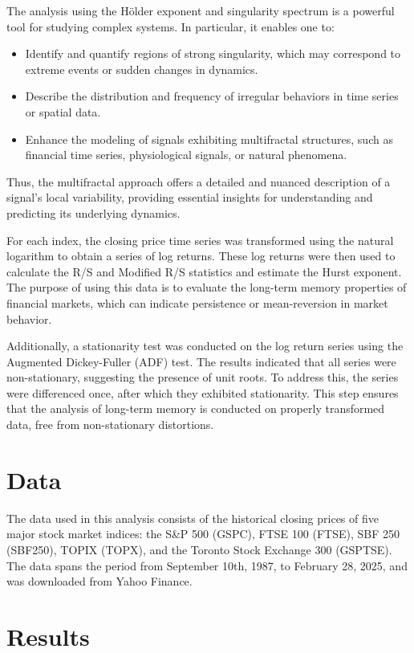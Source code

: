 \documentclass[11pt]{extarticle}
\begin{document}
The analysis using the Hölder exponent and singularity spectrum is a powerful tool for studying complex systems. In particular, it enables one to:
\begin{itemize}
    \item Identify and quantify regions of strong singularity, which may correspond to extreme events or sudden changes in dynamics.
    \item Describe the distribution and frequency of irregular behaviors in time series or spatial data.
    \item Enhance the modeling of signals exhibiting multifractal structures, such as financial time series, physiological signals, or natural phenomena.
\end{itemize}
Thus, the multifractal approach offers a detailed and nuanced description of a signal's local variability, providing essential insights for understanding and predicting its underlying dynamics.

For each index, the closing price time series was transformed using the natural logarithm to obtain a series of log returns.
These log returns were then used to calculate the R/S and Modified R/S statistics and estimate the Hurst exponent.
The purpose of using this data is to evaluate the long-term memory properties of financial markets, which can indicate persistence or mean-reversion in market behavior.

Additionally, a stationarity test was conducted on the log return series using the Augmented Dickey-Fuller (ADF) test.
The results indicated that all series were non-stationary, suggesting the presence of unit roots. To address this, the series were differenced once, after which they exhibited stationarity.
This step ensures that the analysis of long-term memory is conducted on properly transformed data, free from non-stationary distortions.

\section{Data}

The data used in this analysis consists of the historical closing prices of five major stock market indices: the S\&P 500 (GSPC), FTSE 100 (FTSE), SBF 250 (SBF250), TOPIX (TOPX), and the Toronto Stock Exchange 300 (GSPTSE).
The data spans the period from September 10th, 1987, to February 28, 2025, and was downloaded from Yahoo Finance.

\section{Results}
\end{document}
